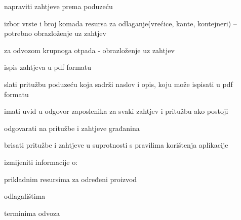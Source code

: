 \begin{packed_enum}
\begin{packed_enum}
\begin{packed_enum}
					\end{packed_enum}
					
					\item napraviti zahtjeve prema poduzeću 
					
					\begin{packed_enum}
						
						\item izbor vrste i broj komada resursa za odlaganje(vrećice, kante, kontejneri) – potrebno                                obrazloženje uz zahtjev
						\item za odvozom krupnoga otpada - obrazloženje uz zahtjev
						\item ispis zahtjeva u pdf formatu		 		
						
					\end{packed_enum}
					
					\item slati pritužbu poduzeću koja sadrži naslov i opis, koju može ispisati u pdf formatu
					\item imati uvid u odgovor zaposlenika za svaki zahtjev i pritužbu ako postoji
					
				\end{packed_enum}
				
				\item {}
				
				\begin{packed_enum}
					
					\item odgovarati na pritužbe i zahtjeve građanina
					\item brisati pritužbe i zahtjeve u suprotnosti s pravilima korištenja aplikacije
					\item izmijeniti informacije o:  
					
					\begin{packed_enum}
						
						\item prikladnim resursima za određeni proizvod
						\item odlagalištima
						\item terminima odvoza
						
					\end{packed_enum}
					
				\end{packed_enum}
				
				\item {}
				

\end{packed_enum}
